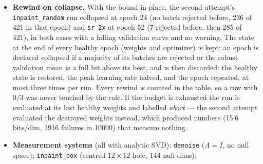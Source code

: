 \documentclass[11pt]{article}
\begin{document}
\begin{itemize}
        \texttt{inpaint\_box} model of the second attempt (one batch of 64,
        six draws of $\epsilon$), the noise part of the gradient had RMS norm
        $19.4$ against $22.5$ for the expected gradient, and the individual
        draws had cosine $0.50$--$0.87$ with it: roughly half of every
        clipped step was noise, in a valley whose width in the coupling's
        shift is $\tau \approx 2\times10^{-3}$ (the gain $a$ multiplies any
        shift error, and $a\tau \approx \sigma$ at the optimum). Because the
        base is Gaussian the expectation over $\epsilon$ is available in
        closed form,
        \[
          \mathbb{E}_\epsilon \log\mathcal{N}(f(x); A^{+}y, \Sigma_1)
          = \log\mathcal{N}(f(x); A^{+}Ax, \Sigma_1) - \frac{\mathrm{rank}\,A}{2\gamma},
        \]
        which is the same objective with the target noise integrated out
        (verified numerically on all five systems: the mean of 400 sampled
        draws matches the closed form to within $2.5$ standard errors).
        Training uses it (\texttt{train\_target: expected}); evaluation
        always scores real $(x, y)$ pairs, so every reported bpd is a
        conditional likelihood. The ablations keep the sampled target.
  \item \textbf{Rewind on collapse.} With the bound in place, the second
        attempt's \texttt{inpaint\_random} run collapsed at epoch 24 (no
        batch rejected before, 236 of 421 in that epoch) and \texttt{sr\_2x}
        at epoch 52 (7 rejected before, then 285 of 421), in both cases with
        a falling validation curve and no warning. The state at the end of
        every healthy epoch (weights and optimizer) is kept; an epoch is
        declared collapsed if a majority of its batches are rejected or the
        robust validation mean is a full bit above its best, and is then
        discarded: the healthy state is restored, the peak learning rate
        halved, and the epoch repeated, at most three times per run. Every
        rewind is counted in the table, so a row with $0/3$ was never touched
        by the rule. If the budget is exhausted the run is evaluated at its
        last healthy weights and labelled \emph{abort} --- the second
        attempt evaluated the destroyed weights instead, which produced
        numbers (15.6 bits/dim, 1916 failures in 10000) that measure nothing.
  \item \textbf{Measurement systems} (all with analytic SVD):
        \texttt{denoise} ($A = I$, no null space);
        \texttt{inpaint\_box} (centred $12\times12$ hole, 144 null dims);

\end{itemize}
\end{document}
